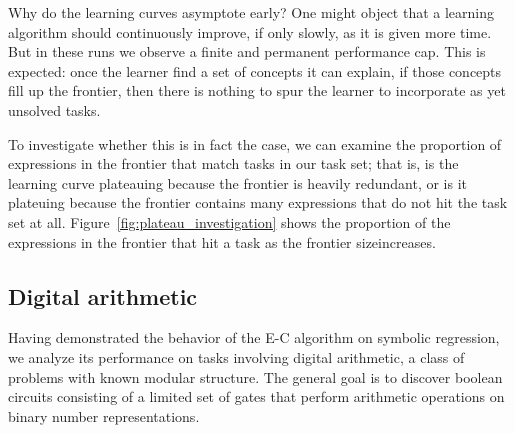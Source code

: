 \documentclass{article}
\begin{document}
Why do the learning curves asymptote early? One might object that a
learning algorithm should continuously improve, if only slowly, as it
is given more time. But in these runs we observe a finite and
permanent performance cap. This is expected: once the learner find a
set of concepts it can explain, if those concepts fill up the
frontier, then there is nothing to spur the learner to incorporate as
yet unsolved tasks. 

To investigate whether this is in fact the case, we can examine the
proportion of expressions in the frontier that match tasks in our task
set; that is, is the learning curve plateauing because the frontier is
heavily redundant, or is it plateuing because the frontier contains
many expressions that do not hit the task set at
all. Figure~\ref{fig:plateau_investigation} shows the proportion of
the expressions in the frontier that hit a task as the frontier sizeincreases.


\subsection{Digital arithmetic}
Having demonstrated the behavior of the E-C algorithm on symbolic
regression, we analyze its performance on tasks involving digital
arithmetic, a class of problems with known modular structure. The
general goal is to discover boolean circuits consisting of a limited
set of gates that perform arithmetic operations on binary number
representations. 






\nocite{*}
\end{document}
